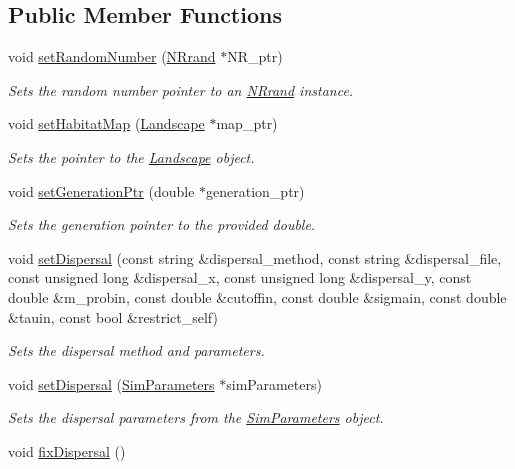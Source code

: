 \subsection*{Public Member Functions}
\begin{DoxyCompactItemize}
\item 
void \hyperlink{class_dispersal_coordinator_a3cfdb18edbf4dd1c45d0cf6af47f91fe}{set\+Random\+Number} (\hyperlink{class_n_rrand}{N\+Rrand} $\ast$N\+R\+\_\+ptr)
\begin{DoxyCompactList}\small\item\em Sets the random number pointer to an \hyperlink{class_n_rrand}{N\+Rrand} instance. \end{DoxyCompactList}\item 
void \hyperlink{class_dispersal_coordinator_a0db146f56de14e0b4a095526a7b6c779}{set\+Habitat\+Map} (\hyperlink{class_landscape}{Landscape} $\ast$map\+\_\+ptr)
\begin{DoxyCompactList}\small\item\em Sets the pointer to the \hyperlink{class_landscape}{Landscape} object. \end{DoxyCompactList}\item 
void \hyperlink{class_dispersal_coordinator_aad9a57afe4629674c958e4d0de4d2451}{set\+Generation\+Ptr} (double $\ast$generation\+\_\+ptr)
\begin{DoxyCompactList}\small\item\em Sets the generation pointer to the provided double. \end{DoxyCompactList}\item 
void \hyperlink{class_dispersal_coordinator_a977652ff40148fa7e0a0bfff049b9568}{set\+Dispersal} (const string \&dispersal\+\_\+method, const string \&dispersal\+\_\+file, const unsigned long \&dispersal\+\_\+x, const unsigned long \&dispersal\+\_\+y, const double \&m\+\_\+probin, const double \&cutoffin, const double \&sigmain, const double \&tauin, const bool \&restrict\+\_\+self)
\begin{DoxyCompactList}\small\item\em Sets the dispersal method and parameters. \end{DoxyCompactList}\item 
void \hyperlink{class_dispersal_coordinator_a8504699586755df070b44da71ea346a5}{set\+Dispersal} (\hyperlink{struct_sim_parameters}{Sim\+Parameters} $\ast$sim\+Parameters)
\begin{DoxyCompactList}\small\item\em Sets the dispersal parameters from the \hyperlink{struct_sim_parameters}{Sim\+Parameters} object. \end{DoxyCompactList}\item 
void \hyperlink{class_dispersal_coordinator_a588b959feff178953c37bfeae7aa8529}{fix\+Dispersal} ()\hypertarget{class_dispersal_coordinator_a588b959feff178953c37bfeae7aa8529}{}\label{class_dispersal_coordinator_a588b959feff178953c37bfeae7aa8529}


\end{DoxyCompactItemize}
